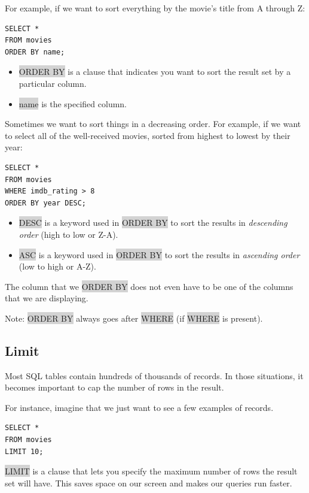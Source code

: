 \documentclass[11pt]{article}
\begin{document}
{{For example, if we want to sort everything by the movie’s title from A through Z:
\begin{lstlisting}
SELECT *
FROM movies
ORDER BY name;
\end{lstlisting}
\begin{itemize}[leftmargin = *]
\item \colorbox{lightgray}{ORDER BY} is a clause that indicates you want to sort the result set by a particular column.
\item \colorbox{lightgray}{name} is the specified column.
\end{itemize}
Sometimes we want to sort things in a decreasing order. For example, if we want to select all of the well-received movies, sorted from highest to lowest by their year:
\begin{lstlisting}
SELECT *
FROM movies
WHERE imdb_rating > 8
ORDER BY year DESC;
\end{lstlisting}
\begin{itemize}[leftmargin = *]
\item \colorbox{lightgray}{DESC} is a keyword used in \colorbox{lightgray}{ORDER BY} to sort the results in \textit{descending order} (high to low or Z-A).
\item \colorbox{lightgray}{ASC} is a keyword used in \colorbox{lightgray}{ORDER BY} to sort the results in \textit{ascending order} (low to high or A-Z).
\end{itemize}
The column that we \colorbox{lightgray}{ORDER BY} does not even have to be one of the columns that we are displaying.

Note: \colorbox{lightgray}{ORDER BY} always goes after \colorbox{lightgray}{WHERE} (if \colorbox{lightgray}{WHERE} is present).

\subsection{Limit}
Most SQL tables contain hundreds of thousands of records. In those situations, it becomes important to cap the number of rows in the result.

For instance, imagine that we just want to see a few examples of records.
\begin{lstlisting}
SELECT *
FROM movies
LIMIT 10;
\end{lstlisting}
\colorbox{lightgray}{LIMIT} is a clause that lets you specify the maximum number of rows the result set will have. This saves space on our screen and makes our queries run faster.

}}
\end{document}
